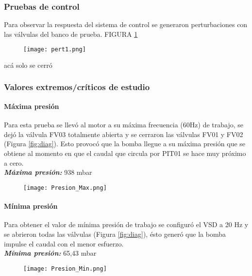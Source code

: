 {\subsubsection{Pruebas de control}
Para observar la respuesta del sistema de control se generaron perturbaciones con las válvulas del banco de prueba. FIGURA \ref{fig:pert1}
\begin{figure}[htb]
	\centering
	\texttt{[image: pert1.png]}
	\label{fig:pert1}
\end{figure}
 acá solo se cerró


\subsubsection{Valores extremos/críticos de estudio}

\paragraph{Máxima presión}

Para esta prueba se llevó al motor a su máxima frecuencia (60Hz) de trabajo, se dejó la válvula FV03 totalmente abierta y se cerraron las válvulas FV01 y FV02 (Figura  \ref{fig:diag}). Esto provocó que la bomba llegue a su máxima presión que se obtiene al momento en que el caudal que circula por PIT01 se hace muy próximo a cero.\\
\textbf{\textit{Máxima presión:}} 938 mbar
\begin{figure}[h!]
	\centering
	\texttt{[image: Presion\_Max.png]}
	\label{fig:PMAX}
\end{figure}

\paragraph{Mínima presión}
Para obtener el valor de mínima presión de trabajo se configuró el VSD a 20 Hz y se abrieron todas las válvulas (Figura  \ref{fig:diag}), ésto generó que la bomba impulse el caudal con el menor esfuerzo. \\
\textbf{\textit{Mínima presión:}} 65,43 mbar
\begin{figure}[h!]
	\centering
	\texttt{[image: Presion\_Min.png]}
	\label{fig:Pmin}
\end{figure}

}
